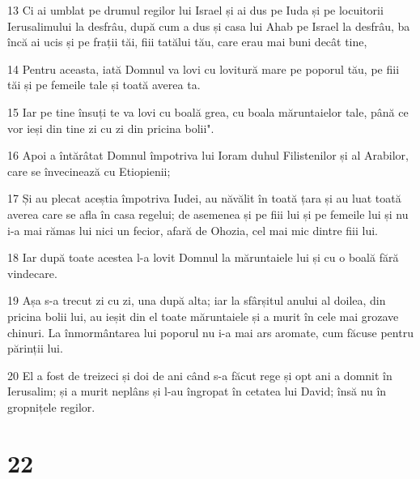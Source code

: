 \par 13 Ci ai umblat pe drumul regilor lui Israel și ai dus pe Iuda și pe locuitorii Ierusalimului la desfrâu, după cum a dus și casa lui Ahab pe Israel la desfrâu, ba încă ai ucis și pe frații tăi, fiii tatălui tău, care erau mai buni decât tine,
\par 14 Pentru aceasta, iată Domnul va lovi cu lovitură mare pe poporul tău, pe fiii tăi și pe femeile tale și toată averea ta.
\par 15 Iar pe tine însuți te va lovi cu boală grea, cu boala măruntaielor tale, până ce vor ieși din tine zi cu zi din pricina bolii".
\par 16 Apoi a întărâtat Domnul împotriva lui Ioram duhul Filistenilor și al Arabilor, care se învecinează cu Etiopienii;
\par 17 Și au plecat aceștia împotriva Iudei, au năvălit în toată țara și au luat toată averea care se afla în casa regelui; de asemenea și pe fiii lui și pe femeile lui și nu i-a mai rămas lui nici un fecior, afară de Ohozia, cel mai mic dintre fiii lui.
\par 18 Iar după toate acestea l-a lovit Domnul la măruntaiele lui și cu o boală fără vindecare.
\par 19 Așa s-a trecut zi cu zi, una după alta; iar la sfârșitul anului al doilea, din pricina bolii lui, au ieșit din el toate măruntaiele și a murit în cele mai grozave chinuri. La înmormântarea lui poporul nu i-a mai ars aromate, cum făcuse pentru părinții lui.
\par 20 El a fost de treizeci și doi de ani când s-a făcut rege și opt ani a domnit în Ierusalim; și a murit neplâns și l-au îngropat în cetatea lui David; însă nu în gropnițele regilor.

\chapter{22}

